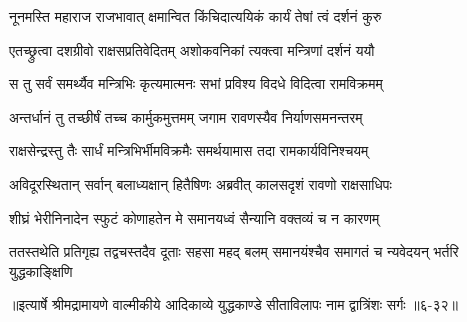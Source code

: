 \twolineshloka
{नूनमस्ति महाराज राजभावात् क्षमान्वित}
{किंचिदात्ययिकं कार्यं तेषां त्वं दर्शनं कुरु} %

\twolineshloka
{एतच्छ्रुत्वा दशग्रीवो राक्षसप्रतिवेदितम्}
{अशोकवनिकां त्यक्त्वा मन्त्रिणां दर्शनं ययौ} %

\twolineshloka
{स तु सर्वं समर्थ्यैव मन्त्रिभिः कृत्यमात्मनः}
{सभां प्रविश्य विदधे विदित्वा रामविक्रमम्} %

\twolineshloka
{अन्तर्धानं तु तच्छीर्षं तच्च कार्मुकमुत्तमम्}
{जगाम रावणस्यैव निर्याणसमनन्तरम्} %

\twolineshloka
{राक्षसेन्द्रस्तु तैः सार्धं मन्त्रिभिर्भीमविक्रमैः}
{समर्थयामास तदा रामकार्यविनिश्चयम्} %

\twolineshloka
{अविदूरस्थितान् सर्वान् बलाध्यक्षान् हितैषिणः}
{अब्रवीत् कालसदृशं रावणो राक्षसाधिपः} %

\twolineshloka
{शीघ्रं भेरीनिनादेन स्फुटं कोणाहतेन मे}
{समानयध्वं सैन्यानि वक्तव्यं च न कारणम्} %

\twolineshloka
{ततस्तथेति प्रतिगृह्य तद्वचस्तदैव दूताः सहसा महद् बलम्}
{समानयंश्चैव समागतं च न्यवेदयन् भर्तरि युद्धकाङ्क्षिणि} %


॥इत्यार्षे श्रीमद्रामायणे वाल्मीकीये आदिकाव्ये युद्धकाण्डे सीताविलापः नाम द्वात्रिंशः सर्गः ॥६-३२॥
